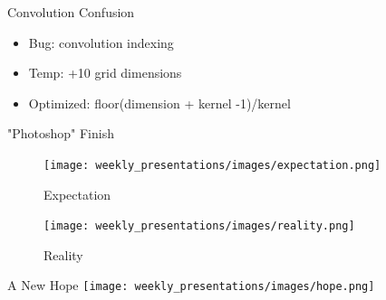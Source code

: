 \begin{frame}{Convolution Confusion}
    \begin{itemize}
        \item Bug: convolution indexing
        \item Temp: +10 grid dimensions
        \item Optimized: floor(dimension + kernel -1)/kernel
    \end{itemize}    
\end{frame}

\begin{frame}{"Photoshop" Finish}
    \centering
    \begin{figure}
        \texttt{[image: weekly\_presentations/images/expectation.png]}
        \caption{Expectation}

        \vspace{1em}

        \texttt{[image: weekly\_presentations/images/reality.png]}
        \caption{Reality}
        
    \end{figure}
\end{frame}

\begin{frame}{A New Hope}
    \hspace*{0.025\textwidth}  %
    \texttt{[image: weekly\_presentations/images/hope.png]}
\end{frame}

